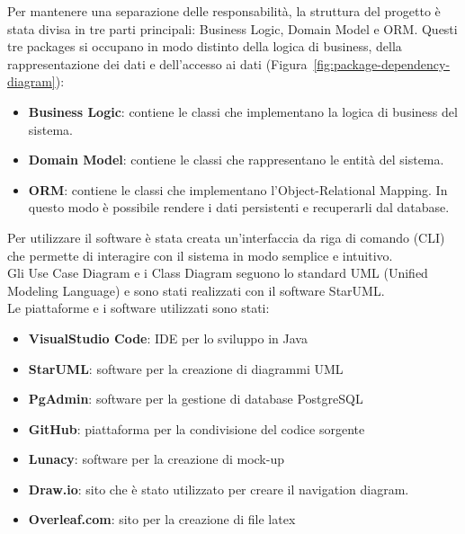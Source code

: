 \documentclass{article}
\begin{document}
            \noindent Per mantenere una separazione delle responsabilità, la struttura del progetto è stata divisa in tre parti principali: Business Logic, Domain Model e ORM.
            Questi tre packages si occupano in modo distinto della logica di business, della rappresentazione dei dati e dell'accesso ai dati (Figura~\ref{fig:package-dependency-diagram}):
            \begin{itemize}
                \item \textbf{Business Logic}: contiene le classi che implementano la logica di business del sistema.
                \item \textbf{Domain Model}: contiene le classi che rappresentano le entità del sistema.
                \item \textbf{ORM}: contiene le classi che implementano l'Object-Relational Mapping. In questo modo è possibile rendere
                                    i dati persistenti e recuperarli dal database.
            \end{itemize}

            \noindent Per utilizzare il software è stata creata un'interfaccia da riga di comando (CLI) che permette di interagire con il sistema in modo semplice e intuitivo. \\

            \noindent Gli Use Case Diagram e i Class Diagram seguono lo standard UML (Unified Modeling Language) e sono stati realizzati con il software StarUML. \\

            \noindent Le piattaforme e i software utilizzati sono stati:
            \begin{itemize}
                \item \textbf{VisualStudio Code}: IDE per lo sviluppo in Java
                \item \textbf{StarUML}: software per la creazione di diagrammi UML
                \item \textbf{PgAdmin}: software per la gestione di database PostgreSQL
                \item \textbf{GitHub}: piattaforma per la condivisione del codice sorgente
                \item \textbf{Lunacy}: software per la creazione di mock-up
                \item \textbf{Draw.io}: sito che è stato utilizzato per creare il navigation diagram.
                \item \textbf{Overleaf.com}: sito per la creazione di file latex
            \end{itemize}
\end{document}

